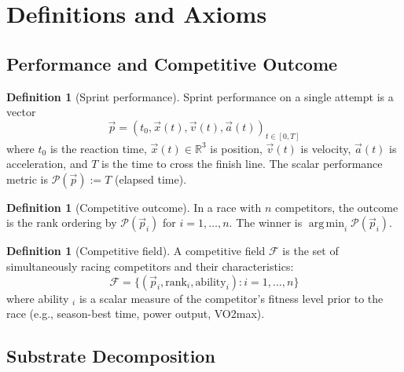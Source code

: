 \documentclass[11pt,twocolumn]{article}
\theoremstyle{definition}
\newtheorem{definition}[theorem]{Definition}
\theoremstyle{remark}
\newcommand{\R}{\mathbb{R}}
\newcommand{\argmin}{\operatorname*{arg\,min}}
\newcommand{\Perf}{\mathcal{P}}
\newcommand{\Field}{\mathcal{F}}
\begin{document}
\section{Definitions and Axioms}
\label{sec:definitions}

\subsection{Performance and Competitive Outcome}

\begin{definition}[Sprint performance]
Sprint performance on a single attempt is a vector
\begin{equation}
\vec{p} = (t_0, \vec{x}(t), \vec{v}(t), \vec{a}(t))_{t \in [0, T]}
\end{equation}
where $t_0$ is the reaction time, $\vec{x}(t) \in \R^3$ is position, $\vec{v}(t)$ is velocity, $\vec{a}(t)$ is acceleration, and $T$ is the time to cross the finish line. The scalar performance metric is $\Perf(\vec{p}) := T$ (elapsed time).
\end{definition}

\begin{definition}[Competitive outcome]
In a race with $n$ competitors, the outcome is the rank ordering by $\Perf(\vec{p}_i)$ for $i=1,\ldots,n$. The winner is $\argmin_i \Perf(\vec{p}_i)$.
\end{definition}

\begin{definition}[Competitive field]
A competitive field $\Field$ is the set of simultaneously racing competitors and their characteristics:
\begin{equation}
\Field = \{ (\vec{p}_i, \text{rank}_i, \text{ability}_i) : i = 1, \ldots, n \}
\end{equation}
where ability $_i$ is a scalar measure of the competitor's fitness level prior to the race (e.g., season-best time, power output, VO2max).
\end{definition}

\subsection{Substrate Decomposition}
\end{document}
